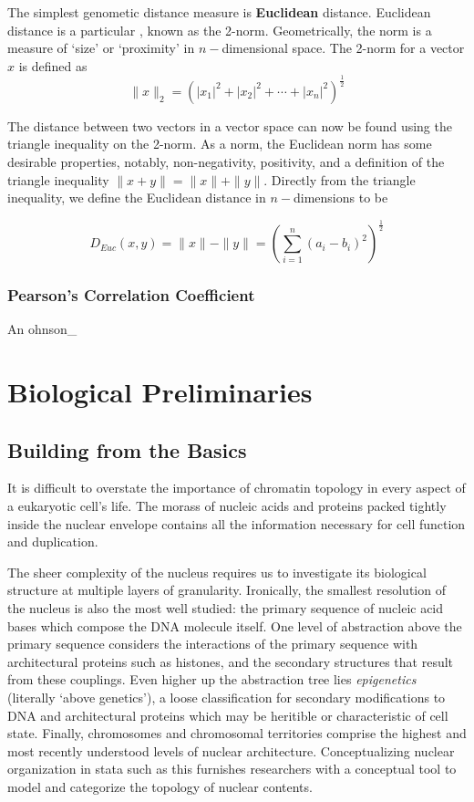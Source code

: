 \documentclass[phd,tocprelim]{cornell}
\begin{document}
The simplest genometic distance measure is \textbf{Euclidean} distance.  Euclidean distance is a particular , known as
the 2-norm.  Geometrically, the norm is a measure of `size' or `proximity' in $n-$dimensional space.  The 2-norm for a vector $x$ is
defined as
\[
  \|x\|_{2} = {(|x_1|^2 + |x_2|^2 + \cdots + |x_n|^2)}^{\frac{1}{2}}
\]

The distance between two vectors in a vector space can now be found using the triangle inequality on the 2-norm.  As a norm, the Euclidean
norm has some desirable properties, notably, non-negativity, positivity, and a definition of the triangle inequality
$\|x + y\| = \|x\| + \|y\|$\cite{horn2013}.  Directly from the triangle inequality, we define the Euclidean distance
in $n-$dimensions to be

\[
  D_{Euc}(x,y) = \|x\| - \|y\| = {(\sum_{i=1}^{n}{(a_i - b_i)}^2)}^{\frac{1}{2}}
\]

\subsection{Pearson's Correlation Coefficient}
An ohnson_

\chapter{Biological Preliminaries}

\section{Building from the Basics}

It is difficult to overstate the importance of chromatin topology in
every aspect of a eukaryotic cell's life.  The morass of nucleic acids and
proteins packed tightly inside the nuclear envelope contains all the
information necessary for cell function and duplication.

The sheer complexity of the nucleus requires us to investigate its biological
structure at multiple layers of granularity.  Ironically, the smallest resolution
of the nucleus is also the most well studied: the primary sequence of nucleic
acid bases which compose the DNA molecule itself.  One level of abstraction
above the primary sequence considers the interactions of the primary sequence
with architectural proteins such as histones, and the secondary structures that
result from these couplings.  Even higher up the abstraction tree lies
\textit{epigenetics} (literally `above genetics'\cite{dictepi2014}), a loose
classification for secondary modifications to DNA and architectural proteins
which may be heritible or characteristic of cell state.  Finally, chromosomes
and chromosomal territories comprise the highest and most recently understood
levels of nuclear architecture.  Conceptualizing nuclear organization in
stata such as this furnishes researchers with a conceptual tool to model
and categorize the topology of nuclear contents.
\end{document}
